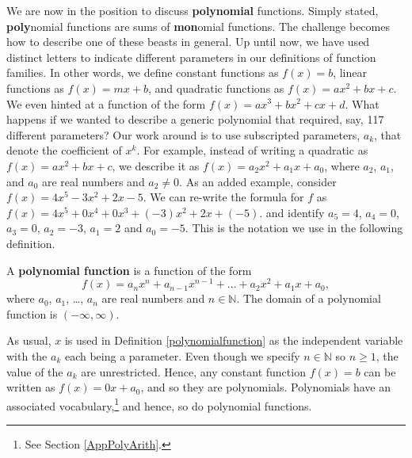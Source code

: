 \documentclass{ximera}
\begin{document}
 We are now in the position to discuss \textbf{polynomial} functions.  Simply stated, \textbf{poly}nomial functions are sums of \textbf{mon}omial functions.  The challenge becomes how to describe one of these beasts in general.  Up until now, we have used distinct letters to indicate different parameters in our definitions of function families.  In other words, we define constant functions as $f(x) = b$, linear functions as $f(x) = mx+b$, and quadratic functions as $f(x) = ax^2+bx+c$.  We even hinted at a function of the form $f(x) = ax^3+bx^2+cx+d$.  What happens if we wanted to describe a generic polynomial that required, say, 117 different parameters? Our work around is to use subscripted parameters,  $a_k$, that  denote the coefficient of $x^{k}$. For example, instead of writing a quadratic as $f(x) = ax^2+bx+c$, we describe it as $f(x) = a_2 x^2 + a_1 x + a_0$, where $a_2$, $a_1$, and $a_0$ are real numbers and $a_2 \neq 0$.   As an added example, consider $f(x) = 4x^5 - 3x^2 + 2x - 5$.   We can re-write the formula for $f$ as $f(x)= 4x^5 + 0 x^{4} + 0 x^{3} + (-3)x^2 + 2 x + (-5).$ and identify  $a_5 = 4$, $a_4 = 0$, $a_3 = 0$, $a_2 = -3$, $a_1 = 2$ and $a_0 = -5$.   This is the notation we use in the following definition.



\begin{definition} \label{polynomialfunction} A \textbf{polynomial function} is a function of the form \[ f(x) = a_{n} x^{n} + a_{n-1} x^{n-1} + \ldots + a_2 x^2 + a_1 x + a_0,\] where $a_0$, $a_1$, \ldots, $a_{n}$ are real numbers and $n \in \mathbb{N}$.  The domain of a polynomial function is $(-\infty, \infty)$.

\end{definition}



As usual, $x$ is used in Definition \ref{polynomialfunction}  as the independent variable with the $a_k$ each being a parameter.  Even though we specify $n  \in  \mathbb{N}$ so $n \geq 1$, the value of the $a_k$ are unrestricted. Hence, any constant function $f(x) = b$ can be written as $f(x) = 0 x + a_0$, and so they are polynomials.  Polynomials have an associated vocabulary,\footnote{See Section \ref{AppPolyArith}.}  and hence, so do polynomial functions.

\end{document}
